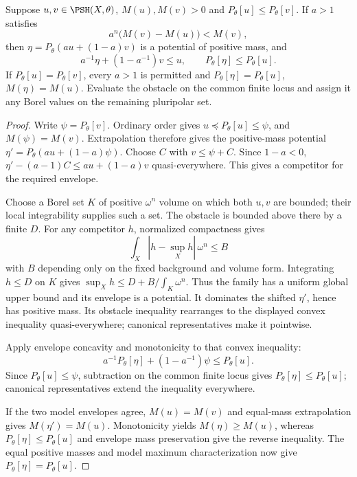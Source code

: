 \begin{theorem}\label{thm:model-order-rooftop-extrapolation}
Suppose $u,v\in\PSH(X,\theta)$, $M(u),M(v)>0$ and $P_\theta[u]\leq P_\theta[v]$. If $a>1$ satisfies
\[
 a^n\bigl(M(v)-M(u)\bigr)<M(v),
\]
then $\eta=P_\theta(a u+(1-a)v)$ is a potential of positive mass, and
\[
 a^{-1}\eta+(1-a^{-1})v\leq u,
                   \qquad P_\theta[\eta]\leq P_\theta[u].
\]
If $P_\theta[u]=P_\theta[v]$, every $a>1$ is permitted and
$P_\theta[\eta]=P_\theta[u]$, $M(\eta)=M(u)$. Evaluate the obstacle on the common finite locus and assign it any Borel values on the remaining pluripolar set.
\end{theorem}
\begin{proof}
Write $\psi=P_\theta[v]$. Ordinary order gives $u\preceq P_\theta[u]\leq\psi$, and $M(\psi)=M(v)$. Extrapolation therefore gives the positive-mass potential
$\eta'=P_\theta(a u+(1-a)\psi)$. Choose $C$ with $v\leq\psi+C$. Since $1-a<0$,
$\eta'-(a-1)C\leq a u+(1-a)v$ quasi-everywhere. This gives a competitor for the required envelope.

Choose a Borel set $K$ of positive $\omega^n$ volume on which both $u,v$ are bounded; their local integrability supplies such a set. The obstacle is bounded above there by a finite $D$. For any competitor $h$, normalized compactness gives
\[
 \int_X|h-\sup_Xh|\,\omega^n\leq B
\]
with $B$ depending only on the fixed background and volume form. Integrating $h\leq D$ on $K$ gives $\sup_Xh\leq D+B/\int_K\omega^n$. Thus the family has a uniform global upper bound and its envelope is a potential. It dominates the shifted $\eta'$, hence has positive mass. Its obstacle inequality rearranges to the displayed convex inequality quasi-everywhere; canonical representatives make it pointwise.

Apply envelope concavity and monotonicity to that convex inequality:
\[
 a^{-1}P_\theta[\eta]+(1-a^{-1})\psi\leq P_\theta[u].
\]
Since $P_\theta[u]\leq\psi$, subtraction on the common finite locus gives $P_\theta[\eta]\leq P_\theta[u]$; canonical representatives extend the inequality everywhere.

If the two model envelopes agree, $M(u)=M(v)$ and equal-mass extrapolation gives $M(\eta')=M(u)$. Monotonicity yields $M(\eta)\geq M(u)$, whereas $P_\theta[\eta]\leq P_\theta[u]$ and envelope mass preservation give the reverse inequality. The equal positive masses and model maximum characterization now give $P_\theta[\eta]=P_\theta[u]$.
\end{proof}

